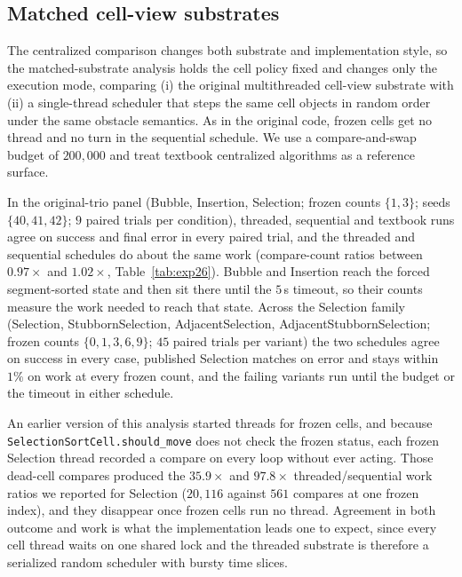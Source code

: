 \documentclass[11pt]{article}
\begin{document}
\subsection{Matched cell-view substrates}
The centralized comparison changes both substrate and implementation style, so the
matched-substrate analysis holds the cell policy fixed and changes only the execution mode,
comparing (i) the original multithreaded cell-view substrate with (ii) a single-thread scheduler
that steps the same cell objects in random order under the same obstacle semantics. As in the
original code, frozen cells get no thread and no turn in the sequential schedule. We use a
compare-and-swap budget of $200{,}000$ and treat textbook centralized algorithms as a reference
surface.

In the original-trio panel (Bubble, Insertion, Selection; frozen counts $\{1,3\}$; seeds
$\{40,41,42\}$; $9$ paired trials per condition), threaded, sequential and textbook runs agree on
success and final error in every paired trial, and the threaded and sequential schedules do about
the same work (compare-count ratios between $0.97\times$ and $1.02\times$,
Table~\ref{tab:exp26}). Bubble and Insertion reach the forced segment-sorted state and then sit
there until the $5$\,s timeout, so their counts measure the work needed to reach that state.
Across the Selection family (Selection, StubbornSelection, AdjacentSelection,
AdjacentStubbornSelection; frozen counts $\{0,1,3,6,9\}$; $45$ paired trials per variant) the two
schedules agree on success in every case, published Selection matches on error and stays within
$1\%$ on work at every frozen count, and the failing variants run until the budget or the timeout
in either schedule.

An earlier version of this analysis started threads for frozen cells, and because
\texttt{SelectionSortCell.should\_move} does not check the frozen status, each frozen Selection
thread recorded a compare on every loop without ever acting. Those dead-cell compares produced the
$35.9\times$ and $97.8\times$ threaded/sequential work ratios we reported for Selection
($20{,}116$ against $561$ compares at one frozen index), and they disappear once frozen cells run
no thread. Agreement in both outcome and work is what the implementation leads one to expect,
since every cell thread waits on one shared lock and the threaded substrate is therefore a
serialized random scheduler with bursty time slices.
\end{document}
